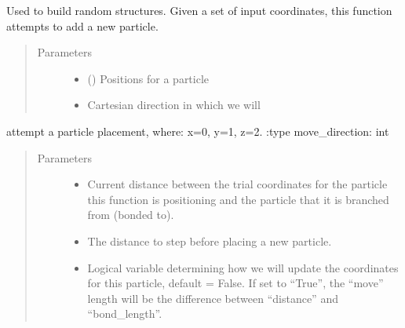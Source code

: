 \documentclass[letterpaper,12pt,english,openany,oneside]{sphinxmanual}
\begin{document}
\begin{fulllineitems}
\label{\detokenize{utilities:utilities.util.get_move}}
Used to build random structures.  Given a set of input coordinates, this function attempts to add a new particle.
\begin{quote}\begin{description}
\item[{Parameters}] \leavevmode\begin{itemize}
\item {} 
 (\sphinxstyleliteralemphasis{\sphinxupquote{( }}\sphinxstyleliteralemphasis{\sphinxupquote{ ( }}\sphinxstyleliteralemphasis{\sphinxupquote{ ) }}\sphinxstyleliteralemphasis{\sphinxupquote{)}}) \textendash{} Positions for a particle

\item {} 
 \textendash{} Cartesian direction in which we will

\end{itemize}

\end{description}\end{quote}

attempt a particle placement, where: x=0, y=1, z=2. 
:type move\_direction: int
\begin{quote}\begin{description}
\item[{Parameters}] \leavevmode\begin{itemize}
\item {} 
 \textendash{} Current distance between the trial coordinates for the particle this function is positioning and the particle that it is branched from (bonded to).

\item {} 
 \textendash{} The distance to step before placing a new particle.

\item {} 
 \textendash{} Logical variable determining how we will update the coordinates for this particle, default = False.  If set to “True”, the “move” length will be the difference between “distance” and “bond\_length”.


\end{itemize}
\end{description}
\end{quote}
\end{fulllineitems}
\end{document}
